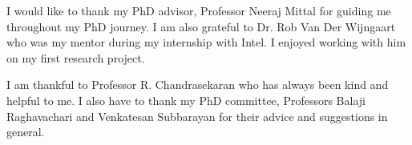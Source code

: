 I would like to thank my PhD advisor, Professor Neeraj Mittal for guiding me throughout my PhD journey. I am also grateful to Dr. Rob Van Der Wijngaart who was my mentor during my internship with Intel. I enjoyed working with him on my first research project.

I am thankful to Professor R. Chandrasekaran who has always been kind and helpful to me. I also have to thank my PhD committee, Professors Balaji Raghavachari and Venkatesan Subbarayan for their advice and suggestions in general.